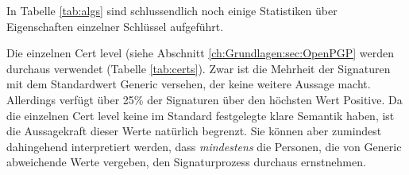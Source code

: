 \begin{table}[ht!]
  \footnotesize
  \centering
  \quad
  \quad
  \caption{Verwendung von Hashalgorithmen 
    , Public-Key-Algorithmen  und
    Cert-Leveln  in der gr\"ossten starken
    Zusammenhangskomponente}
\end{table}

In Tabelle \ref{tab:algs} sind schlussendlich noch einige Statistiken
\"uber Eigenschaften einzelner Schl\"ussel aufgef\"uhrt. 

Die einzelnen Cert level (siehe Abschnitt
\ref{ch:Grundlagen:sec:OpenPGP} werden durchaus verwendet (Tabelle
\ref{tab:certs}). Zwar ist
die Mehrheit der Signaturen mit dem Standardwert Generic versehen, der
keine weitere Aussage macht. Allerdings verf\"ugt \"uber 25\% der
Signaturen \"uber den h\"ochsten Wert Positive. Da die einzelnen Cert
level keine im Standard festgelegte klare Semantik haben, ist die
Aussagekraft dieser Werte nat\"urlich begrenzt. Sie k\"onnen aber
zumindest dahingehend interpretiert werden, dass \emph{mindestens} die
Personen, die von Generic abweichende Werte vergeben, den
Signaturprozess durchaus ernstnehmen.

